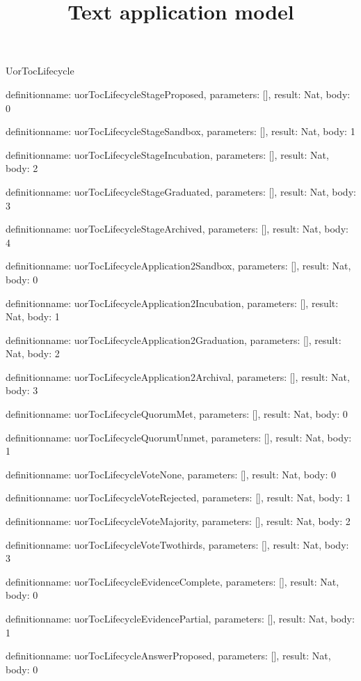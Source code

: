 \begin{lexlean}{UorTocLifecycle}
\title{Text application model}
\begin{semanticmodule}
definition{name: uorTocLifecycleStageProposed, parameters: [], result: Nat, body: 0}

definition{name: uorTocLifecycleStageSandbox, parameters: [], result: Nat, body: 1}

definition{name: uorTocLifecycleStageIncubation, parameters: [], result: Nat, body: 2}

definition{name: uorTocLifecycleStageGraduated, parameters: [], result: Nat, body: 3}

definition{name: uorTocLifecycleStageArchived, parameters: [], result: Nat, body: 4}

definition{name: uorTocLifecycleApplication2Sandbox, parameters: [], result: Nat, body: 0}

definition{name: uorTocLifecycleApplication2Incubation, parameters: [], result: Nat, body: 1}

definition{name: uorTocLifecycleApplication2Graduation, parameters: [], result: Nat, body: 2}

definition{name: uorTocLifecycleApplication2Archival, parameters: [], result: Nat, body: 3}

definition{name: uorTocLifecycleQuorumMet, parameters: [], result: Nat, body: 0}

definition{name: uorTocLifecycleQuorumUnmet, parameters: [], result: Nat, body: 1}

definition{name: uorTocLifecycleVoteNone, parameters: [], result: Nat, body: 0}

definition{name: uorTocLifecycleVoteRejected, parameters: [], result: Nat, body: 1}

definition{name: uorTocLifecycleVoteMajority, parameters: [], result: Nat, body: 2}

definition{name: uorTocLifecycleVoteTwothirds, parameters: [], result: Nat, body: 3}

definition{name: uorTocLifecycleEvidenceComplete, parameters: [], result: Nat, body: 0}

definition{name: uorTocLifecycleEvidencePartial, parameters: [], result: Nat, body: 1}

definition{name: uorTocLifecycleAnswerProposed, parameters: [], result: Nat, body: 0}


\end{semanticmodule}
\end{lexlean}
